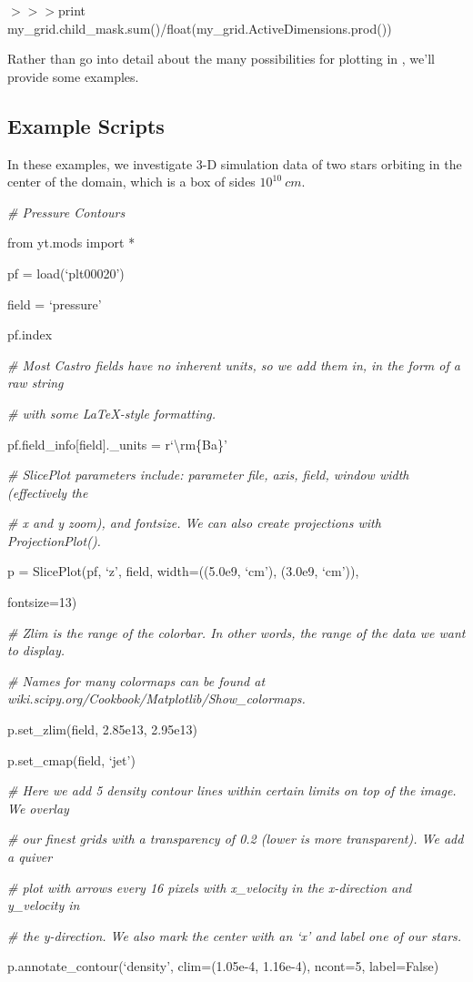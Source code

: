 {\scriptsize$>>>$}print my\_grid.child\_mask.sum()/float(my\_grid.ActiveDimensions.prod())

Rather than go into detail about the many possibilities for plotting
in \yt, we'll provide some examples.

\subsection{Example Scripts}

In these examples, we investigate 3-D simulation data of two stars
orbiting in the center of the domain, which is a box of sides
$10^{10}\:cm$.


{\it\# Pressure Contours}
{\setlength{\parskip}{0pt}

from yt.mods import *
}

pf = load(`plt00020')

field = `pressure'

pf.index

{\it\# Most Castro fields have no inherent units, so we add them in,
  in the form of a raw string} 

{\setlength{\parskip}{0pt}

{\it\# with some LaTeX-style formatting.}

pf.field\_info[field].\_units = r`\textbackslash rm\{Ba\}'
}


{\it\# SlicePlot parameters include: parameter file, axis, field, window width (effectively the}
{\setlength{\parskip}{0pt}

{\it\# x and y zoom), and fontsize. We can also create projections with ProjectionPlot().}

p = SlicePlot(pf, `z', field, width=((5.0e9, `cm'), (3.0e9, `cm')),

{\setlength{\parindent}{68pt}fontsize=13)}
}

{\it\# Zlim is the range of the colorbar. In other words, the range of the data we want to display.}
{\setlength{\parskip}{0pt}

{\it\# Names for many colormaps can be found at wiki.scipy.org/Cookbook/Matplotlib/Show\_colormaps.}

p.set\_zlim(field, 2.85e13, 2.95e13)
}

p.set\_cmap(field, `jet')

{\it\# Here we add 5 density contour lines within certain limits on top of the image. We overlay}
{\setlength{\parskip}{0pt}

{\it\# our finest grids with a transparency of 0.2 (lower is more transparent). We add a quiver}

{\it\# plot with arrows every 16 pixels with x\_velocity in the x-direction and y\_velocity in}

{\it\# the y-direction. We also mark the center with an `x' and label one of our stars.}

p.annotate\_contour(`density', clim=(1.05e-4, 1.16e-4), ncont=5, label=False)
}


